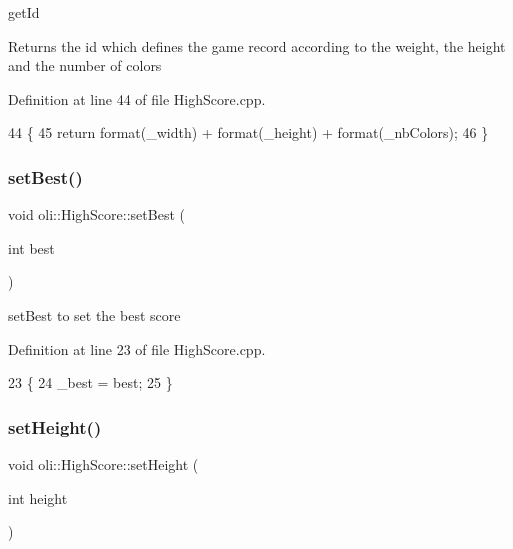 get\+Id 

\begin{DoxyReturn}{Returns}
the id which defines the game record according to the weight, the height and the number of colors 
\end{DoxyReturn}


Definition at line 44 of file High\+Score.\+cpp.


\begin{DoxyCode}
44                               \{
45    \textcolor{keywordflow}{return} format(\_width) + format(\_height) + format(\_nbColors);
46 \}
\end{DoxyCode}
\hypertarget{classoli_1_1_high_score_a2a8626c74ae1c37f49bd4334600f493c}{}\label{classoli_1_1_high_score_a2a8626c74ae1c37f49bd4334600f493c} 
\subsubsection{\texorpdfstring{set\+Best()}{setBest()}}
{\footnotesize\ttfamily void oli\+::\+High\+Score\+::set\+Best (\begin{DoxyParamCaption}\item[{int}]{best }\end{DoxyParamCaption})}



set\+Best to set the best score 



Definition at line 23 of file High\+Score.\+cpp.


\begin{DoxyCode}
23                                \{
24     \_best = best;
25 \}
\end{DoxyCode}
\hypertarget{classoli_1_1_high_score_aa3e83b28bf2f086cc19f2049d508fe03}{}\label{classoli_1_1_high_score_aa3e83b28bf2f086cc19f2049d508fe03} 
\subsubsection{\texorpdfstring{set\+Height()}{setHeight()}}
{\footnotesize\ttfamily void oli\+::\+High\+Score\+::set\+Height (\begin{DoxyParamCaption}\item[{int}]{height }\end{DoxyParamCaption})}




